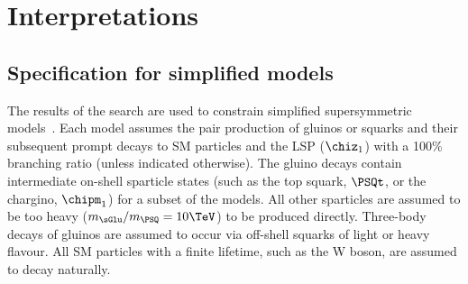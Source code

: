 \section{Interpretations} 
\label{sec:interpretations}

\subsection{Specification for simplified models} 

The results of the search are used to constrain simplified
supersymmetric models~\cite{Alwall:2008ag, Alwall:2008va, sms}. Each
model assumes the pair production of gluinos or squarks and their
subsequent prompt decays to SM particles and the LSP ($\chiz_1$) with
a 100\% branching ratio (unless indicated otherwise). The gluino
decays contain intermediate on-shell sparticle states (such as the top
squark, $\PSQt$, or the chargino, $\chipm_1$) for a subset of the
models. All other sparticles are assumed to be too heavy ($m_{\sGlu} /
m_{\PSQ} = 10\TeV$) to be produced directly. Three-body decays of
gluinos are assumed to occur via off-shell squarks of light or heavy
flavour. All SM particles with a finite lifetime, such as the W boson,
are assumed to decay naturally.

